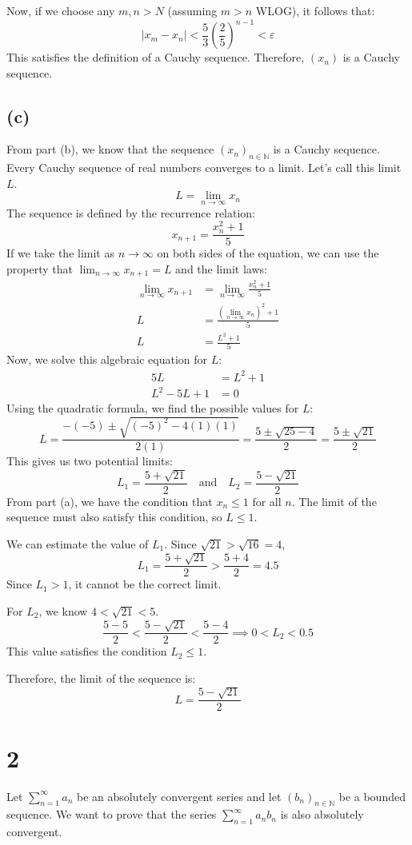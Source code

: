 \documentclass[12pt,a4paper]{article}
\theoremstyle{definition}
\theoremstyle{remark}
\begin{document}
Now, if we choose any $m, n > N$ (assuming $m>n$ WLOG), it follows that:
\[
|x_m - x_n| < \frac{5}{3} \left(\frac{2}{5}\right)^{n-1} < \varepsilon
\]
This satisfies the definition of a Cauchy sequence. Therefore, $(x_n)$ is a Cauchy sequence.


\subsection*{(c)}
From part (b), we know that the sequence $(x_n)_{n \in \mathbb{N}}$ is a Cauchy sequence. Every Cauchy sequence of real numbers converges to a limit. Let's call this limit $L$.
$$ L = \lim_{n \to \infty} x_n $$
The sequence is defined by the recurrence relation:
$$ x_{n+1} = \frac{x_n^2 + 1}{5} $$
If we take the limit as $n \to \infty$ on both sides of the equation, we can use the property that $\lim_{n \to \infty} x_{n+1} = L$ and the limit laws:
\begin{align*}
    \lim_{n \to \infty} x_{n+1} &= \lim_{n \to \infty} \frac{x_n^2 + 1}{5} \\
    L &= \frac{(\lim_{n \to \infty} x_n)^2 + 1}{5} \\
    L &= \frac{L^2 + 1}{5}
\end{align*}
Now, we solve this algebraic equation for $L$:
\begin{align*}
    5L &= L^2 + 1 \\
    L^2 - 5L + 1 &= 0
\end{align*}
Using the quadratic formula, we find the possible values for $L$:
$$ L = \frac{-(-5) \pm \sqrt{(-5)^2 - 4(1)(1)}}{2(1)} = \frac{5 \pm \sqrt{25 - 4}}{2} = \frac{5 \pm \sqrt{21}}{2} $$
This gives us two potential limits:
$$ L_1 = \frac{5 + \sqrt{21}}{2} \quad \text{and} \quad L_2 = \frac{5 - \sqrt{21}}{2} $$
From part (a), we have the condition that $x_n \le 1$ for all $n$. The limit of the sequence must also satisfy this condition, so $L \le 1$.

We can estimate the value of $L_1$. Since $\sqrt{21} > \sqrt{16} = 4$,
$$ L_1 = \frac{5 + \sqrt{21}}{2} > \frac{5 + 4}{2} = 4.5 $$
Since $L_1 > 1$, it cannot be the correct limit.

For $L_2$, we know $4 < \sqrt{21} < 5$.
$$ \frac{5 - 5}{2} < \frac{5 - \sqrt{21}}{2} < \frac{5 - 4}{2} \implies 0 < L_2 < 0.5 $$
This value satisfies the condition $L_2 \le 1$.

Therefore, the limit of the sequence is:
$$ L = \frac{5 - \sqrt{21}}{2} $$

\section*{2}
Let $\sum_{n=1}^{\infty} a_n$ be an absolutely convergent series and let $(b_n)_{n \in \mathbb{N}}$ be a bounded sequence. We want to prove that the series $\sum_{n=1}^{\infty} a_n b_n$ is also absolutely convergent.
\end{document}
